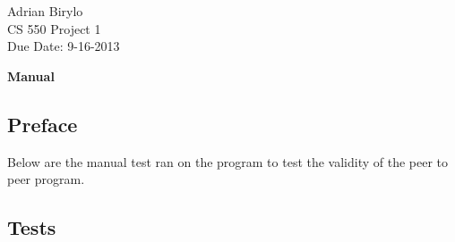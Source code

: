 \documentclass{article}
\begin{document}
\begin{flushright}
Adrian Birylo\\
CS 550 Project 1\\
Due Date: 9-16-2013\\
\end{flushright}

\begin{center}
\textbf{\huge{Manual}}
\end{center}



\subsection*{Preface}
Below are the manual test ran on the program to test the validity of the peer to peer program. 

\subsection*{Tests}
\end{document}
